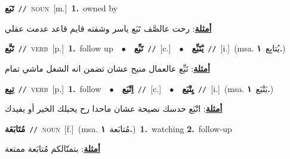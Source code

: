 \documentclass[10pt,a4paper,twoside]{article} %
\begin{document}
\begin{multicols}{2}
{\setlength\topsep{0pt}\textbf{\foreignlanguage{arabic}{تَبَع}}\ {\color{gray}\texttt{//}\color{black}}\ \textsc{noun}\ [m.]\ \textbf{1.}~owned by\  \begin{flushright}\color{gray}\foreignlanguage{arabic}{\textbf{\underline{\foreignlanguage{arabic}{أمثلة}}}: رحت عالصَّف تَبَع ياسر وشفته قايم قاعد عدمت عقلي}\end{flushright}\color{black}} \vspace{2mm}

{\setlength\topsep{0pt}\textbf{\foreignlanguage{arabic}{تَبَّع}}\ {\color{gray}\texttt{//}\color{black}}\ \textsc{verb}\ [p.]\ \textbf{1.}~follow up\ \ $\bullet$\ \ \setlength\topsep{0pt}\textbf{\foreignlanguage{arabic}{تَبِّع}}\ {\color{gray}\texttt{//}\color{black}}\ [c.]\ \ $\bullet$\ \ \setlength\topsep{0pt}\textbf{\foreignlanguage{arabic}{يْتَبِّع}}\ {\color{gray}\texttt{//}\color{black}}\ [i.]\ \color{gray}(msa. \foreignlanguage{arabic}{يُتابِع}~\foreignlanguage{arabic}{\textbf{١.}})\color{black}\  \begin{flushright}\color{gray}\foreignlanguage{arabic}{\textbf{\underline{\foreignlanguage{arabic}{أمثلة}}}: تَبِّع عالعمال منيح عشان تضمن انه الشغل ماشي تمام}\end{flushright}\color{black}} \vspace{2mm}

{\setlength\topsep{0pt}\textbf{\foreignlanguage{arabic}{تِبِع}}\ {\color{gray}\texttt{//}\color{black}}\ \textsc{verb}\ [p.]\ \textbf{1.}~follow\ \ $\bullet$\ \ \setlength\topsep{0pt}\textbf{\foreignlanguage{arabic}{اِتْبَع}}\ {\color{gray}\texttt{//}\color{black}}\ [c.]\ \ $\bullet$\ \ \setlength\topsep{0pt}\textbf{\foreignlanguage{arabic}{يِتْبَع}}\ {\color{gray}\texttt{//}\color{black}}\ [i.]\ \color{gray}(msa. \foreignlanguage{arabic}{يَتْبَع}~\foreignlanguage{arabic}{\textbf{١.}})\color{black}\  \begin{flushright}\color{gray}\foreignlanguage{arabic}{\textbf{\underline{\foreignlanguage{arabic}{أمثلة}}}: اتْبَع حدسك نصيحة عشان ماحدا رح يحبلك الخير أو يفيدك}\end{flushright}\color{black}} \vspace{2mm}

{\setlength\topsep{0pt}\textbf{\foreignlanguage{arabic}{مُتَابَعَة}}\ {\color{gray}\texttt{//}\color{black}}\ \textsc{noun}\ [f.]\ \color{gray}(msa. \foreignlanguage{arabic}{مُتابَعة}~\foreignlanguage{arabic}{\textbf{١.}})\color{black}\ \textbf{1.}~watching  \textbf{2.}~follow-up\  \begin{flushright}\color{gray}\foreignlanguage{arabic}{\textbf{\underline{\foreignlanguage{arabic}{أمثلة}}}: بتمنّالكم مُتابَعة ممتعة}\end{flushright}\color{black}} \vspace{2mm}


\end{multicols}
\end{document}
